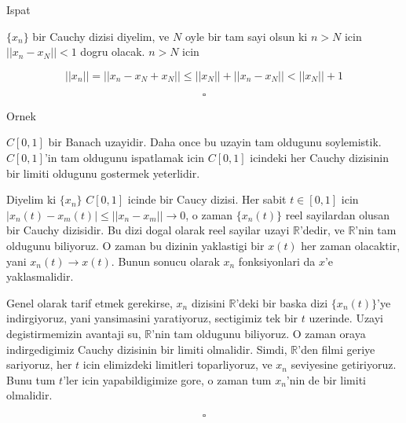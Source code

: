 \documentclass[12pt,fleqn]{article}\usepackage{../common}
\begin{document}
Ispat

$\{x_n\}$ bir Cauchy dizisi diyelim, ve $N$ oyle bir tam sayi olsun ki $n >
N$ 
icin $||x_n - x_N|| < 1$ dogru olacak. $n > N$ icin

\[ ||x_n|| = ||x_n - x_N + x_N || \le ||x_N|| + ||x_n - x_N|| < ||x_N|| + 1 \]

\[ \square \]

Ornek

$C[0,1]$ bir Banach uzayidir. Daha once bu uzayin tam oldugunu
soylemistik. $C[0,1]$'in tam oldugunu ispatlamak icin $C[0,1]$ icindeki her
Cauchy dizisinin bir limiti oldugunu gostermek yeterlidir. 

Diyelim ki $\{x_n\}$ $C[0,1]$ icinde bir Caucy dizisi. Her sabit $t \in
[0,1]$ 
icin $|x_n(t) - x_m(t)| \le ||x_n - x_m|| \to 0$, o zaman  $\{x_n(t)\}$
reel sayilardan olusan bir Cauchy dizisidir. Bu dizi dogal olarak reel
sayilar uzayi $\mathbb{R}$'dedir, ve $\mathbb{R}$'nin tam oldugunu
biliyoruz. O zaman bu dizinin yaklastigi bir $x(t)$ her zaman olacaktir,
yani $x_n(t) \to x(t)$. Bunun sonucu olarak $x_n$ fonksiyonlari da $x$'e
yaklasmalidir. 

Genel olarak tarif etmek gerekirse, $x_n$ dizisini $\mathbb{R}$'deki bir
baska dizi $\{x_n(t)\}$'ye indirgiyoruz, yani yansimasini yaratiyoruz,
sectigimiz tek bir $t$ uzerinde. Uzayi degistirmemizin avantaji su,
$\mathbb{R}$'nin tam oldugunu biliyoruz. O zaman oraya indirgedigimiz
Cauchy dizisinin bir limiti olmalidir. Simdi, $\mathbb{R}$'den filmi geriye
sariyoruz, her $t$ icin elimizdeki limitleri toparliyoruz, ve $x_n$
seviyesine getiriyoruz. Bunu tum $t$'ler icin yapabildigimize gore, o zaman
tum $x_n$'nin de bir limiti olmalidir. 

\[ \square \]
\end{document}
